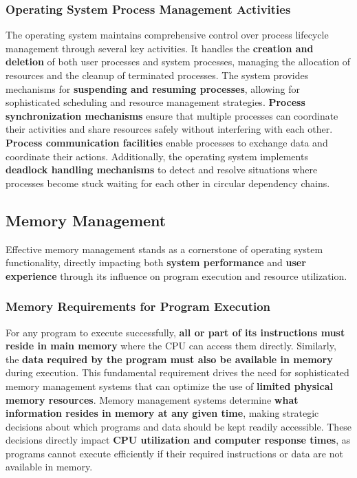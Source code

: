\subsubsection{Operating System Process Management Activities}

The operating system maintains comprehensive control over process lifecycle management through several key activities. It handles the \textbf{creation and deletion} of both user processes and system processes, managing the allocation of resources and the cleanup of terminated processes. The system provides mechanisms for \textbf{suspending and resuming processes}, allowing for sophisticated scheduling and resource management strategies.
\textbf{Process synchronization mechanisms} ensure that multiple processes can coordinate their activities and share resources safely without interfering with each other. \textbf{Process communication facilities} enable processes to exchange data and coordinate their actions. Additionally, the operating system implements \textbf{deadlock handling mechanisms} to detect and resolve situations where processes become stuck waiting for each other in circular dependency chains.


\subsection{Memory Management}

Effective memory management stands as a cornerstone of operating system functionality, directly impacting both \textbf{system performance} and \textbf{user experience} through its influence on program execution and resource utilization.


\subsubsection{Memory Requirements for Program Execution}

For any program to execute successfully, \textbf{all or part of its instructions must reside in main memory} where the CPU can access them directly. Similarly, the \textbf{data required by the program must also be available in memory} during execution. This fundamental requirement drives the need for sophisticated memory management systems that can optimize the use of \textbf{limited physical memory resources}.
Memory management systems determine \textbf{what information resides in memory at any given time}, making strategic decisions about which programs and data should be kept readily accessible. These decisions directly impact \textbf{CPU utilization and computer response times}, as programs cannot execute efficiently if their required instructions or data are not available in memory.


